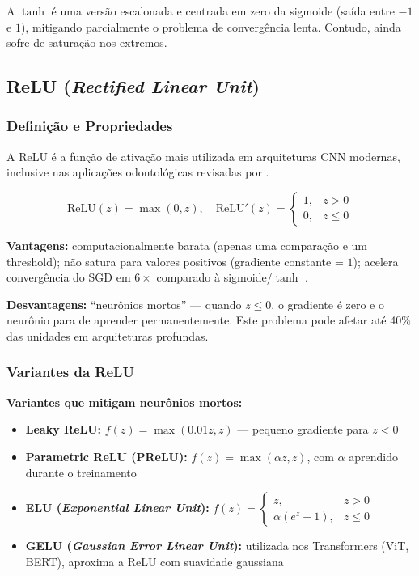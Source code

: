 A $\tanh$ é uma versão escalonada e centrada em zero da sigmoide (saída entre $-1$
e $1$), mitigando parcialmente o problema de convergência lenta. Contudo, ainda sofre
de saturação nos extremos.

\subsection{ReLU (\textit{Rectified Linear Unit})}

\subsubsection{Definição e Propriedades}

A ReLU é a função de ativação mais utilizada em arquiteturas CNN modernas, inclusive
nas aplicações odontológicas revisadas por .

\begin{equation}
  \text{ReLU}(z) = \max(0, z), \quad \text{ReLU}'(z) = \begin{cases}
    1, & z > 0 \\
    0, & z \leq 0
  \end{cases}
  \label{eq:relu}
\end{equation}

\textbf{Vantagens:} computacionalmente barata (apenas uma comparação e um threshold);
não satura para valores positivos (gradiente constante = $1$); acelera convergência
do SGD em $6\times$ comparado à sigmoide/$\tanh$ \cite{lecun2015deep}.

\textbf{Desvantagens:} ``neurônios mortos'' --- quando $z \leq 0$, o gradiente é zero
e o neurônio para de aprender permanentemente. Este problema pode afetar até 40\%
das unidades em arquiteturas profundas.

\subsubsection{Variantes da ReLU}

\textbf{Variantes que mitigam neurônios mortos:}
\begin{itemize}
  \item \textbf{Leaky ReLU:} $f(z) = \max(0.01z, z)$ --- pequeno gradiente para $z < 0$
  \item \textbf{Parametric ReLU (PReLU):} $f(z) = \max(\alpha z, z)$, com $\alpha$
        aprendido durante o treinamento
  \item \textbf{ELU (\textit{Exponential Linear Unit}):}
        $f(z) = \begin{cases} z, & z > 0 \\ \alpha(e^z - 1), & z \leq 0 \end{cases}$
  \item \textbf{GELU (\textit{Gaussian Error Linear Unit}):} utilizada nos
        Transformers (ViT, BERT), aproxima a ReLU com suavidade gaussiana
\end{itemize}

